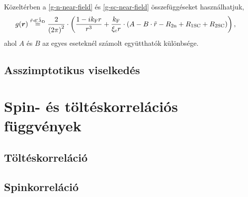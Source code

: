 \documentclass[a4paper,12pt,titlepage]{article}
\newcommand{\RR}{{\vb*{r}}}
\newcommand{\kF}{{k_\text{F}}}
\begin{document}
Közeltérben a \eqref{g-n-near-field} és \eqref{g-sc-near-field} összefüggéseket használhatjuk,
\begin{equation}
\begin{split}
	g(\RR) & \stackrel{\tilde{r} \ll \tilde{\lambda}_\text{D}}{=} \frac{2}{\left( 2 \pi \right)^2} \cdot \left( \frac{1 - i \kF r}{r^3} + \frac{\kF}{\xi_\text{c} r} \cdot \left( A - B \cdot \tilde{r} - R_{2 \text{n}} + R_{1 \text{SC}} + R_{2 \text{SC}} \right) \right),
\end{split}
\end{equation}
ahol $A$ és $B$ az egyes eseteknél számolt együtthatók különbsége.


\subsection{Asszimptotikus viselkedés}



\section{Spin- és töltéskorrelációs függvények}

\subsection{Töltéskorreláció}
\subsection{Spinkorreláció}




\begin{thebibliography}{}
\end{thebibliography}
\end{document}
